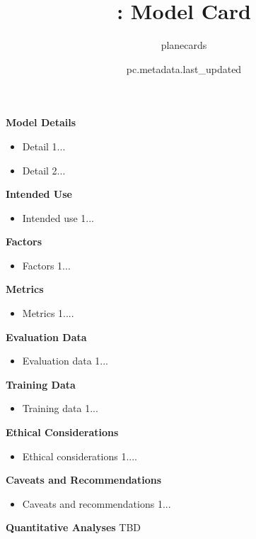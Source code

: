 \documentclass{article}
\title{\VAR{pc.metadata.name}: Model Card}
\author{planecards}
\date{pc.metadata.last_updated}
\begin{document}
\newenvironment{mcsection}[1]
    {
        \textbf{#1}

     
        \begin{itemize}[leftmargin=*,topsep=0pt,itemsep=-1ex,partopsep=1ex,parsep=1ex,after=\vspace{\medskipamount}]
    }
    {
        \end{itemize}
    }

\begin{adjustwidth}{-60pt}{-30pt}
\begin{singlespace}

\begin{tcolorbox}[title=\textbf{\VAR{pc.metadata.name} : Model Card},
    breakable, sharp corners, boxrule=0.7pt]
\small{


\begin{mcsection}{Model Details}
    \item Detail 1...
    \item Detail 2...
\end{mcsection}

\begin{mcsection}{Intended Use}
    \item Intended use 1...
\end{mcsection}

\begin{mcsection}{Factors}
    \item Factors 1...
\end{mcsection}

\begin{mcsection}{Metrics}
    \item Metrics 1....
\end{mcsection}

\begin{mcsection}{Evaluation Data}
    \item Evaluation data 1...
\end{mcsection}

\begin{mcsection}{Training Data}
    \item Training data 1...
\end{mcsection}

\begin{mcsection}{Ethical Considerations}
    \item Ethical considerations 1....
\end{mcsection}

\begin{mcsection}{Caveats and Recommendations}
    \item Caveats and recommendations 1...
\end{mcsection}

\textbf{Quantitative Analyses}
TBD
\end{tcolorbox}
\end{singlespace}
\end{adjustwidth}
\end{document}
